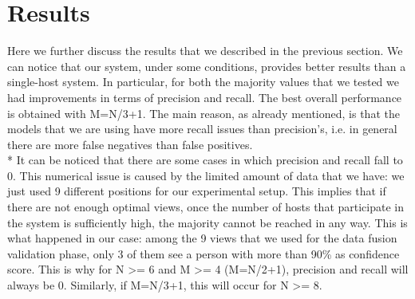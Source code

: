 \documentclass[10pt,conference,compsocconf]{IEEEtran}
\begin{document}
\section{Results}
\label{sec:results}
Here we further discuss the results that we described in the previous section. We can notice that our system, under some conditions, provides better results than a single-host system. In particular, for both the majority values that we tested we had improvements in terms of precision and recall. The best overall performance is obtained with M=N/3+1. The main reason, as already mentioned, is that the models that we are using have more recall issues than precision's, i.e. in general there are more false negatives than false positives.\\*
It can be noticed that there are some cases in which precision and recall fall to 0. This numerical issue is caused by the limited amount of data that we have: we just used 9 different positions for our experimental setup. This implies that if there are not enough optimal views, once the number of hosts that participate in the system is sufficiently high, the majority cannot be reached in any way. This is what happened in our case: among the 9 views that we used for the data fusion validation phase, only 3 of them see a person with more than 90\% as confidence score. This is why for N \textgreater= 6 and M \textgreater= 4 (M=N/2+1), precision and recall will always be 0. Similarly, if M=N/3+1, this will occur for N \textgreater= 8.
\end{document}
